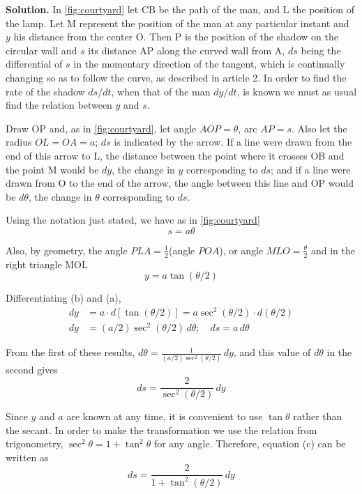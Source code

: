 \noindent\textbf{Solution.} In \autoref{fig:courtyard} let CB be the path of the man, and L the position of the lamp. Let M represent the position of the man at any particular instant and $y$ his distance from the center O. Then P is the position of the shadow on the circular wall and $s$ its distance AP along the curved wall from A, $ds$ being the differential of $s$ in the momentary direction of the tangent, which is continually changing so as to follow the curve, as described in article 2. In order to find the rate of the shadow $ds/dt$, when that of the man $dy/dt$, is known we must as usual find the relation between $y$ and $s$.

Draw OP and, as in \autoref{fig:courtyard}, let angle $AOP=\theta$, arc $AP=s$. Also let the radius $OL=OA=a$; $ds$ is indicated by the arrow. If a line were drawn from the end of this arrow to L, the distance between the point where it crosses OB and the point M would be $dy$, the change in $y$ corresponding to $ds$; and if a line were drawn from O to the end of the arrow, the angle between this line and OP would be $d\theta$, the change in $\theta$ corresponding to $ds$.

Using the notation just stated, we have as in \autoref{fig:courtyard}
\begin{equation}
s = a\theta \tag{a}
\end{equation}

Also, by geometry, the angle $PLA=\frac{1}{2}$(angle $POA$), or angle $MLO=\frac{\theta}{2}$ and in the right triangle MOL
\begin{equation}
y = a\tan(\theta/2) \tag{b}
\end{equation}

Differentiating (b) and (a),
\begin{align*}
dy &= a\cdot d[\tan(\theta/2)] = a\sec^2(\theta/2)\cdot d(\theta/2) \\
dy &= (a/2)\sec^2(\theta/2)\,d\theta; \quad ds = a\,d\theta
\end{align*}

From the first of these results, $d\theta = \frac{1}{(a/2)\sec^2(\theta/2)}\,dy$, and this value of $d\theta$ in the second gives
\begin{equation}
ds = \frac{2}{\sec^2(\theta/2)}\,dy \tag{c}
\end{equation}

Since $y$ and $a$ are known at any time, it is convenient to use $\tan\theta$ rather than the secant. In order to make the transformation we use the relation from trigonometry, $\sec^2\theta = 1 + \tan^2\theta$ for any angle. Therefore, equation (c) can be written as
\begin{equation}
ds = \frac{2}{1+\tan^2(\theta/2)}\,dy \tag{d}
\end{equation}

